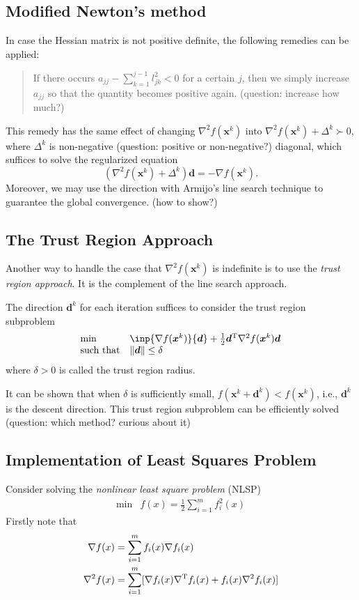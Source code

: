 \subsection{Modified Newton's method}
In case the Hessian matrix is not positive definite, the following remedies can be applied:
\begin{quotation}
If there occurs $a_{jj} - \sum_{k=1}^{j-1}l_{jk}^2<0$ for a certain $j$, then we simply increase $a_{jj}$ so that the quantity becomes positive again. (question: increase how much?)
\end{quotation}

This remedy has the same effect of changing $\nabla^2f(\bm x^k)$ into $\nabla^2f(\bm x^k)+\Delta^k\succ0$, where $\Delta^k$ is non-negative (question: positive or non-negative?) diagonal, which suffices to solve the regularized equation
\[
(\nabla^2f(\bm x^k)+\Delta^k)\bm d = -\nabla f(\bm x^k).
\]
Moreover, we may use the direction with Armijo's line search technique to guarantee the global convergence. (how to show?)

\subsection{The Trust Region Approach}
Another way to handle the case that $\nabla^2f(\bm x^k)$ is indefinite is to use the \emph{trust region approach}. It is the complement of the line search approach.

The direction $\bm d^k$ for each iteration suffices to consider the trust region subproblem
\[
\begin{array}{ll}
\min&\inp{\nabla f(\bm x^k)}{\bm d} + \frac{1}{2}\bm d\trans\nabla^2f(\bm x^k)\bm d\\
\mbox{such that}&\|\bm d\|\le\delta
\end{array}
\]
where $\delta>0$ is called the trust region radius.
\begin{remark}
It can be shown that when $\delta$ is sufficiently small, $f(\bm x^k+\bm d^k)<f(\bm x^k)$, i.e., $\bm d^k$ is the descent direction.
This trust region subproblem can be efficiently solved (question: which method? curious about it)
\end{remark}

\subsection{Implementation of Least Squares Problem}
Consider solving the \emph{nonlinear least square problem} (NLSP)
\[
\begin{array}{ll}
\min&f(x) = \frac{1}{2}\sum_{i=1}^mf_i^2(x)
\end{array}
\]
Firstly note that
\begin{align*}
\nabla f(x)&=\sum_{i=1}^mf_i(x)\nabla f_i(x)\\
\nabla^2f(x)&=\sum_{i=1}^m[\nabla f_i(x)\nabla^{\mathrm T} f_i(x) + f_i(x)\nabla^2f_i(x)]
\end{align*}

